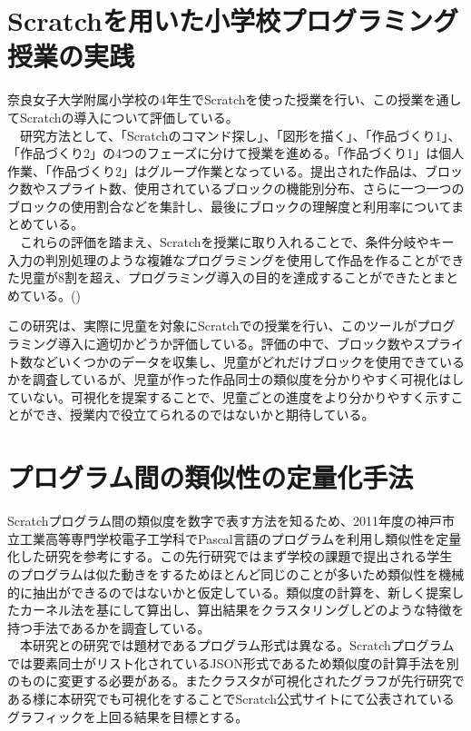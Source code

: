 \documentclass[a4paper,10pt,onecolumn,oneside,openany]{jsbook}
\begin{document}
\section{Scratchを用いた小学校プログラミング授業の実践}
奈良女子大学附属小学校の4年生でScratchを使った授業を行い、この授業を通してScratchの導入について評価している。
\\
　研究方法として、「Scratchのコマンド探し」、「図形を描く」、「作品づくり1」、「作品づくり2」の4つのフェーズに分けて授業を進める。「作品づくり1」は個人作業、「作品づくり2」はグループ作業となっている。提出された作品は、ブロック数やスプライト数、使用されているブロックの機能別分布、さらに一つ一つのブロックの使用割合などを集計し、最後にブロックの理解度と利用率についてまとめている。
\\
　これらの評価を踏まえ、Scratchを授業に取り入れることで、条件分岐やキー入力の判別処理のような複雑なプログラミングを使用して作品を作ることができた児童が8割を超え、プログラミング導入の目的を達成することができたとまとめている。(\cite{preEssay1})

この研究は、実際に児童を対象にScratchでの授業を行い、このツールがプログラミング導入に適切かどうか評価している。評価の中で、ブロック数やスプライト数などいくつかのデータを収集し、児童がどれだけブロックを使用できているかを調査しているが、児童が作った作品同士の類似度を分かりやすく可視化はしていない。可視化を提案することで、児童ごとの進度をより分かりやすく示すことができ、授業内で役立てられるのではないかと期待している。

\section{プログラム間の類似性の定量化手法}
Scratchプログラム間の類似度を数字で表す方法を知るため、2011年度の神戸市立工業高等専門学校電子工学科でPascal言語のプログラムを利用し類似性を定量化した研究を参考にする。この先行研究ではまず学校の課題で提出される学生のプログラムは似た動きをするためほとんど同じのことが多いため類似性を機械的に抽出ができるのではないかと仮定している。類似度の計算を、新しく提案したカーネル法を基にして算出し、算出結果をクラスタリングしどのような特徴を持つ手法であるかを調査している。\cite{preEssay2}
\\
　本研究と\cite{preEssay2}の研究では題材であるプログラム形式は異なる。Scratchプログラムでは要素同士がリスト化されているJSON形式であるため類似度の計算手法を別のものに変更する必要がある。またクラスタが可視化されたグラフが先行研究である様に本研究でも可視化をすることでScratch公式サイトにて公表されているグラフィックを上回る結果を目標とする。
\end{document}
